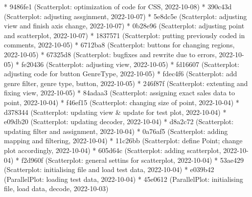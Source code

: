 \documentclass[usegeometry=true]{scrartcl}
\begin{document}
* 9486fe1 (Scatterplot: optimization of code for CSS, 2022-10-08)\newline
* 390c43d (Scatterplot: adjusting assginment, 2022-10-07)\newline
* 5e8dc5e (Scatterplot: adjusting view and finish axis change, 2022-10-07) \newline
* 0b28e96 (Scatterplot: adjusting point and scatterplot, 2022-10-07)\newline
* 1837571 (Scatterplot: putting previously coded in comments, 2022-10-05)\newline
* 6712ba8 (Scatterplot: buttons for changing regions, 2022-10-05)\newline
* 67325d8 (Scatterplot: bugfixes and rewrite due to errors, 2022-10-05)\newline
* fe20436 (Scatterplot: adjusting view, 2022-10-05)\newline
* fd16607 (Scatterplot: adjusting code for button GenreType, 2022-10-05)\newline
* fdec4f6 (Scatterplot: add genre filter, genre type, button, 2022-10-05)\newline
* 246f87f (Scatterplot: extenting and fixing view, 2022-10-05)\newline
* 84adaa3 (Scatterplot: assigning exact sales data to point, 2022-10-04)\newline
* f46ef15 (Scatterplot: changing size of point, 2022-10-04)\newline
* d378344 (Scatterplot: updating view \& update for test plot, 2022-10-04)\newline
* e09db20 (Scatterplot: updating decoder, 2022-10-04)\newline
* d8a2c72 (Scatterplot: updating filter and assignment, 2022-10-04)\newline
* 0a76af5 (Scatterplot: adding mapping and filtering, 2022-10-04)\newline
* 11c26bb (Scatterplot: define Point; change plot accordingly, 2022-10-04) \newline
* 605d64c (Scatterplot: adding scatterplot, 2022-10-04)\newline
* f2d960f (Scatterplot: general settins for scatterplot, 2022-10-04)\newline
* 53ae429 (Scatterplot: initialising file and load test data, 2022-10-04)\newline
* e039b42 (ParallelPlot: loading test data, 2022-10-04)\newline
* 45e0612 (ParallelPlot: initialising file, load data, decode, 2022-10-03) \newline
\end{document}
